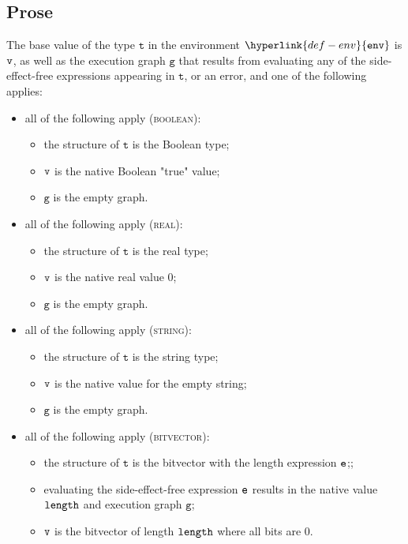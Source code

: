 \documentclass{book}
\newcommand\ErrorConfig[0]{\hyperlink{def-errorconfig}{\texttt{\#DE}}}
\newcommand\ProseOrError[0]{\ProseTerminateAs{\ErrorConfig}}
\newcommand\env[0]{\hyperlink{def-env}{\texttt{env}}}
\newcommand\vg[0]{\texttt{g}}
\newcommand\vt[0]{\texttt{t}}
\begin{document}
\subsection{Prose}
The base value of the type $\vt$ in the environment $\env$ is $\texttt{v}$,
as well as the execution graph $\vg$ that results
from evaluating any of the side-effect-free expressions appearing in $\vt$,
or an error, and one of the following applies:
\begin{itemize}
  \item all of the following apply (\textsc{boolean}):
  \begin{itemize}
    \item the structure of $\vt$ is the Boolean type;
    \item $\texttt{v}$ is the native Boolean "true" value;
    \item $\vg$ is the empty graph.
  \end{itemize}

  \item all of the following apply (\textsc{real}):
  \begin{itemize}
    \item the structure of $\vt$ is the real type;
    \item $\texttt{v}$ is the native real value $0$;
    \item $\vg$ is the empty graph.
  \end{itemize}

  \item all of the following apply (\textsc{string}):
  \begin{itemize}
    \item the structure of $\vt$ is the string type;
    \item $\texttt{v}$ is the native value for the empty string;
    \item $\vg$ is the empty graph.
  \end{itemize}

  \item all of the following apply (\textsc{bitvector}):
  \begin{itemize}
    \item the structure of $\vt$ is the bitvector with the length expression $\texttt{e}$;;
    \item evaluating the side-effect-free expression $\texttt{e}$ results in the native value $\texttt{length}$
    and execution graph $\vg$\ProseOrError;
    \item $\texttt{v}$ is the bitvector of length $\texttt{length}$ where all bits are $0$.
  \end{itemize}


\end{itemize}
\end{document}
